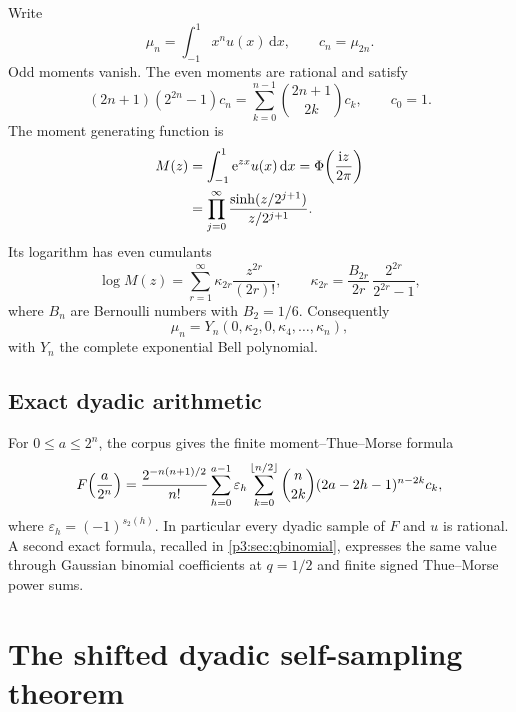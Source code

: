 \documentclass[11pt,oneside]{article}
\numberwithin{equation}{section}
\theoremstyle{definition}
\theoremstyle{remark}
\newcommand{\e}{\mathrm e}
\newcommand{\dd}{\,\mathrm d}
\newcommand{\eps}{\varepsilon}
\begin{document}
Write
\begin{equation}
 \mu_n=\int_{-1}^{1}x^n u(x)\dd x,
 \qquad c_n=\mu_{2n}.
 \label{p3:eq:moments}
\end{equation}
Odd moments vanish.  The even moments are rational and satisfy
\begin{equation}
 (2n+1)(2^{2n}-1)c_n
 =\sum_{k=0}^{n-1}\binom{2n+1}{2k}c_k,
 \qquad c_0=1.
 \label{p3:eq:moment-recurrence}
\end{equation}
The moment generating function is
\begin{align}
 M(z)
 &=\int_{-1}^{1}\e^{zx}u(x)\dd x
 =\Phi\!\left(\frac{\iu z}{2\pi}\right)\notag\\
 &=\prod_{j=0}^{\infty}
 \frac{\sinh(z/2^{j+1})}{z/2^{j+1}}.
 \label{p3:eq:mgf-product}
\end{align}
Its logarithm has even cumulants
\begin{equation}
 \log M(z)=\sum_{r=1}^{\infty}\kappa_{2r}\frac{z^{2r}}{(2r)!},
 \qquad
 \boxed{\displaystyle
 \kappa_{2r}=\frac{B_{2r}}{2r}\,
 \frac{2^{2r}}{2^{2r}-1}},
 \label{p3:eq:cumulants}
\end{equation}
where $B_n$ are Bernoulli numbers with $B_2=1/6$.  Consequently
\begin{equation}
 \mu_n=Y_n(0,\kappa_2,0,\kappa_4,\ldots,\kappa_n),
 \label{p3:eq:moment-Bell}
\end{equation}
with $Y_n$ the complete exponential Bell polynomial.

\subsection{Exact dyadic arithmetic}

For $0\le a\le2^n$, the corpus gives the finite moment--Thue--Morse formula
\begin{equation}
 F\!\left(\frac a{2^n}\right)
 =\frac{2^{-n(n+1)/2}}{n!}
 \sum_{h=0}^{a-1}\eps_h
 \sum_{k=0}^{\floor{n/2}}
 \binom n{2k}(2a-2h-1)^{n-2k}c_k,
 \label{p3:eq:finite-F-moment}
\end{equation}
where $\eps_h=(-1)^{s_2(h)}$.  In particular every dyadic sample of $F$ and $u$ is rational.  A second exact formula, recalled in \cref{p3:sec:qbinomial}, expresses the same value through Gaussian binomial coefficients at $q=1/2$ and finite signed Thue--Morse power sums.

\section{The shifted dyadic self-sampling theorem}
\label{p3:sec:self-sampling}
\end{document}
